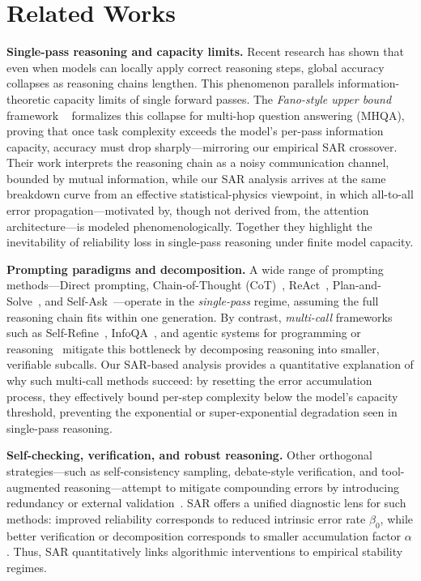\documentclass{article}
\theoremstyle{plain}
\begin{document}
\section{Related Works}

\textbf{Single-pass reasoning and capacity limits.}
Recent research has shown that even when models can locally apply correct reasoning steps, global accuracy collapses as reasoning chains lengthen. This phenomenon parallels information-theoretic capacity limits of single forward passes. The \emph{Fano-style upper bound} framework ~\citep{wan2025fano} formalizes this collapse for multi-hop question answering (MHQA), proving that once task complexity exceeds the model’s per-pass information capacity, accuracy must drop sharply—mirroring our empirical SAR crossover. Their work interprets the reasoning chain as a noisy communication channel, bounded by mutual information, while our SAR analysis arrives at the same breakdown curve from an effective statistical-physics viewpoint, in which all-to-all error propagation---motivated by, though not derived from, the attention architecture---is modeled phenomenologically. Together they highlight the inevitability of reliability loss in single-pass reasoning under finite model capacity.

\textbf{Prompting paradigms and decomposition.}
A wide range of prompting methods—Direct prompting, Chain-of-Thought (CoT)~\citep{wei2022chain,kojima2022large}, ReAct~\citep{yao2023react}, Plan-and-Solve~\citep{wang2023plan}, and Self-Ask~\citep{press2023measuring}—operate in the \emph{single-pass} regime, assuming the full reasoning chain fits within one generation. By contrast, \emph{multi-call} frameworks such as Self-Refine~\citep{madaan2023self}, InfoQA~\citep{wan2025fano}, and agentic systems for programming or reasoning~\citep{li2024survey,qian2024chatdev,kim2024llm} mitigate this bottleneck by decomposing reasoning into smaller, verifiable subcalls. Our SAR-based analysis provides a quantitative explanation of why such multi-call methods succeed: by resetting the error accumulation process, they effectively bound per-step complexity below the model’s capacity threshold, preventing the exponential or super-exponential degradation seen in single-pass reasoning.

\textbf{Self-checking, verification, and robust reasoning.}
Other orthogonal strategies—such as self-consistency sampling, debate-style verification, and tool-augmented reasoning—attempt to mitigate compounding errors by introducing redundancy or external validation~\citep{yao2023react,xie2025fire,wan2025cognitive,mccoy2023embers}. SAR offers a unified diagnostic lens for such methods: improved reliability corresponds to reduced intrinsic error rate $\beta_0$, while better verification or decomposition corresponds to smaller accumulation factor $\alpha$. Thus, SAR quantitatively links algorithmic interventions to empirical stability regimes.
\end{document}
